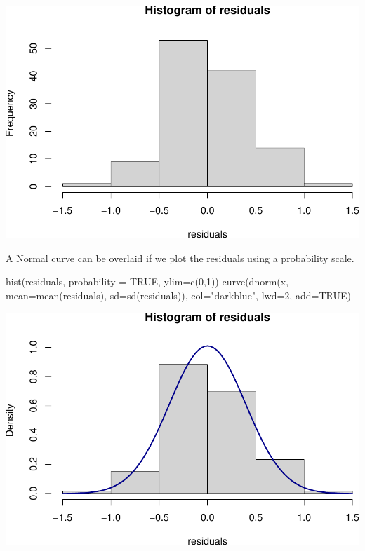 \documentclass[
]{memoir}
\newenvironment{Shaded}{\begin{snugshade}}{\end{snugshade}}
\newcommand{\AttributeTok}[1]{\textcolor[rgb]{0.77,0.63,0.00}{#1}}
\newcommand{\ConstantTok}[1]{\textcolor[rgb]{0.00,0.00,0.00}{#1}}
\newcommand{\DecValTok}[1]{\textcolor[rgb]{0.00,0.00,0.81}{#1}}
\newcommand{\FunctionTok}[1]{\textcolor[rgb]{0.00,0.00,0.00}{#1}}
\newcommand{\NormalTok}[1]{#1}
\newcommand{\StringTok}[1]{\textcolor[rgb]{0.31,0.60,0.02}{#1}}
\begin{document}
\includegraphics{phcm9795-R-notes_files/figure-latex/unnamed-chunk-101-1.pdf}

A Normal curve can be overlaid if we plot the residuals using a probability scale.

\begin{Shaded}
\begin{Highlighting}[]
\FunctionTok{hist}\NormalTok{(residuals, }\AttributeTok{probability =} \ConstantTok{TRUE}\NormalTok{, }\AttributeTok{ylim=}\FunctionTok{c}\NormalTok{(}\DecValTok{0}\NormalTok{,}\DecValTok{1}\NormalTok{))}
\FunctionTok{curve}\NormalTok{(}\FunctionTok{dnorm}\NormalTok{(x, }\AttributeTok{mean=}\FunctionTok{mean}\NormalTok{(residuals), }\AttributeTok{sd=}\FunctionTok{sd}\NormalTok{(residuals)), }
      \AttributeTok{col=}\StringTok{"darkblue"}\NormalTok{, }\AttributeTok{lwd=}\DecValTok{2}\NormalTok{, }\AttributeTok{add=}\ConstantTok{TRUE}\NormalTok{)}
\end{Highlighting}
\end{Shaded}

\includegraphics{phcm9795-R-notes_files/figure-latex/unnamed-chunk-102-1.pdf}
\end{document}
